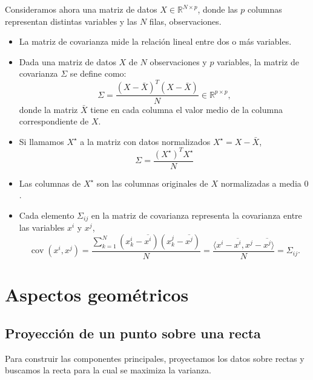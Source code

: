 \documentclass[a4paper]{article}
\DeclareMathOperator{\cov}{cov}
\newcommand{\R}{{\mathbb R}}
\begin{document}
Consideramos ahora una matriz de datos $X \in \R^{N \times p}$, donde las $p$ columnas representan distintas variables y las $N$ filas, observaciones. 
\begin{itemize}
    \item La matriz de covarianza mide la relación lineal entre dos o más variables.
    \item Dada una matriz de datos \( X \) de \( N \) observaciones y \( p \) variables, la matriz de covarianza \( \Sigma \) se define como:
    \[
    \Sigma = \frac{(X - \bar X)^T (X - \bar X)}{N} \in \R^{p \times p},
    \]
    donde la matriz $\bar X$ tiene en cada columna el valor medio de la columna correspondiente de $X$.
    \item Si llamamos $X^\star$ a la matriz con datos normalizados $X^\star = X - \bar X$,
    $$\boxed{\Sigma = \frac{(X^\star)^T X^\star}{N}}$$

    \item Las columnas de $X^\star$ son las columnas originales de $X$ normalizadas a media $0$.
    \item Cada elemento $\Sigma_{ij}$ en la matriz de covarianza representa la covarianza entre las variables $x^i$ y $x^j$,
    $$\cov(x^i, x^j) = \frac{\sum_{k = 1}^N (x_k^i - \overline{x^i})(x_k^j - \overline{x^j})}{N}  = \frac{\langle x^i - \overline{x^i}, x^j - \overline{x^j} \rangle}{N} = {\Sigma}_{ij}.$$
\end{itemize}

\section{Aspectos geométricos}

\subsection{Proyección de un punto sobre una recta}

Para construir las componentes principales, proyectamos los datos sobre rectas y buscamos la recta para la cual se maximiza la varianza.
\end{document}
